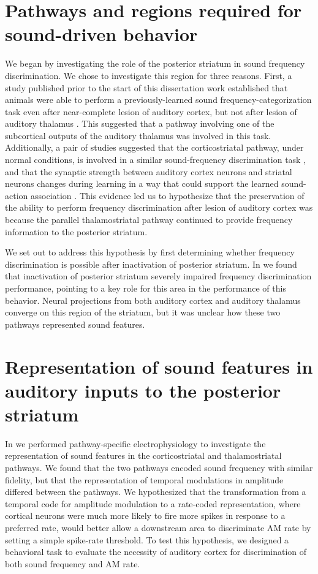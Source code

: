 \section{Pathways and regions required for sound-driven behavior}
We began by investigating the role of the posterior striatum in sound frequency discrimination. 
%
We chose to investigate this region for three reasons. 
%
First, a study published prior to the start of this dissertation work established that animals were able to perform a previously-learned sound frequency-categorization task even after near-complete lesion of auditory cortex, but not after lesion of auditory thalamus \citep{Gimenez2015}.
%
This suggested that a pathway involving one of the subcortical outputs of the auditory thalamus was involved in this task.
%
Additionally, a pair of studies suggested that the corticostriatal pathway, under normal conditions, is involved in a similar sound-frequency discrimination task \citep{Znamenskiy2013}, and that the synaptic strength between auditory cortex neurons and striatal neurons changes during learning in a way that could support the learned sound-action association \citep{Xiong2015}.
%
This evidence led us to hypothesize that the preservation of the ability to perform frequency discrimination after lesion of auditory cortex was because the parallel thalamostriatal pathway continued to provide frequency information to the posterior striatum.

We set out to address this hypothesis by first determining whether frequency discrimination is possible after inactivation of posterior striatum. 
%
In \ch{\Musc} we found that inactivation of posterior striatum severely impaired frequency discrimination performance, pointing to a key role for this area in the performance of this behavior. 
%
Neural projections from both auditory cortex and auditory thalamus converge on this region of the striatum, but it was unclear how these two pathways represented sound features.

\section{Representation of sound features in auditory inputs to the posterior striatum}
In \ch{\Thstr} we performed pathway-specific electrophysiology to investigate the representation of sound features in the corticostriatal and thalamostriatal pathways. 
%
We found that the two pathways encoded sound frequency with similar fidelity, but that the representation of temporal modulations in amplitude differed between the pathways. 
%
We hypothesized that the transformation from a temporal code for amplitude modulation to a rate-coded representation, where cortical neurons were much more likely to fire more spikes in response to a preferred rate, would better allow a downstream area to discriminate AM rate by setting a simple spike-rate threshold. 
%
To test this hypothesis, we designed a behavioral task to evaluate the necessity of auditory cortex for discrimination of both sound frequency and AM rate. 

